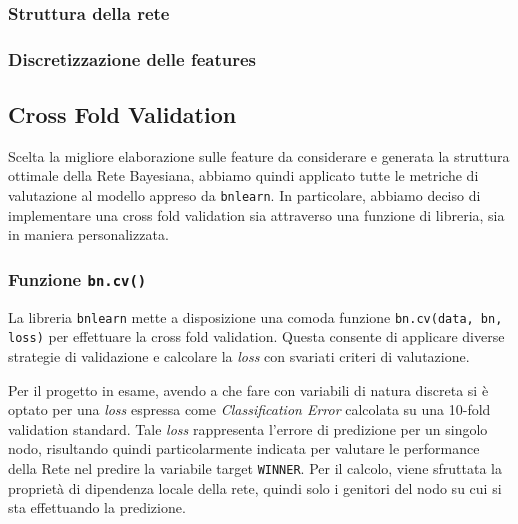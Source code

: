 \documentclass[hidelinks, 12pt]{article}
\begin{document}
\subsubsection{Struttura della rete}


\subsubsection{Discretizzazione delle features}
\label{sec:perf-discret}




\subsection{Cross Fold Validation}
\label{sec:perf-cross-fold}

Scelta la migliore elaborazione sulle feature da considerare e generata la struttura ottimale della Rete Bayesiana, abbiamo quindi applicato tutte le metriche di valutazione al modello appreso da \texttt{bnlearn}. In particolare, abbiamo deciso di implementare una cross fold validation sia attraverso una funzione di libreria, sia in maniera personalizzata.


\subsubsection{Funzione \texttt{bn.cv()}}

La libreria \texttt{bnlearn} mette a disposizione una comoda funzione \texttt{bn.cv(data, bn, loss)} per effettuare la cross fold validation. Questa consente di applicare diverse strategie di validazione e calcolare la \textit{loss} con svariati criteri di valutazione.

Per il progetto in esame, avendo a che fare con variabili di natura discreta si è optato per una \textit{loss} espressa come \textit{Classification Error} calcolata su una 10-fold validation standard. Tale \textit{loss} rappresenta l'errore di predizione per un singolo nodo, risultando quindi particolarmente indicata per valutare le performance della Rete nel predire la variabile target \texttt{WINNER}. Per il calcolo, viene sfruttata la proprietà di dipendenza locale della rete, quindi solo i genitori del nodo su cui si sta effettuando la predizione.
\end{document}
